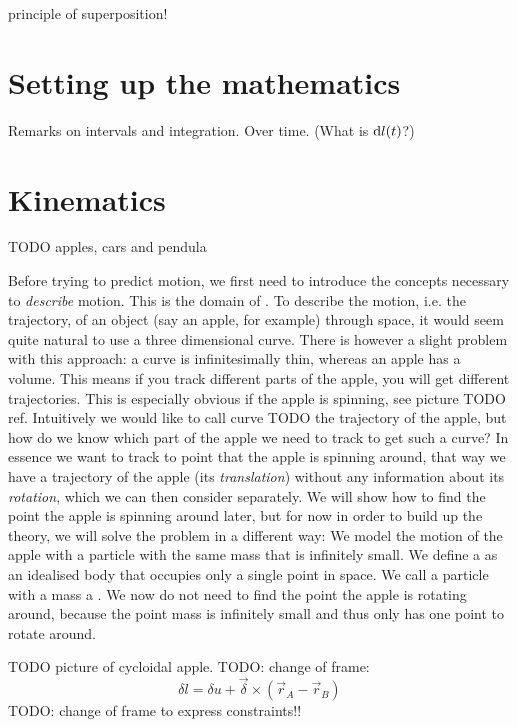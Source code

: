 principle of superposition!

\chapter{Setting up the mathematics}
Remarks on intervals and integration. Over time. (What is $\operatorname{d \!}{l(t)}$?)

\chapter{Kinematics}
TODO apples, cars and pendula


Before trying to predict motion, we first need to introduce the concepts necessary to \textit{describe} motion. This is the domain of . To describe the motion, i.e. the trajectory, of an object (say an apple, for example) through space, it would seem quite natural to use a three dimensional curve. There is however a slight problem with this approach: a curve is infinitesimally thin, whereas an apple has a volume. This means if you track different parts of the apple, you will get different trajectories. This is especially obvious if the apple is spinning, see picture TODO ref. Intuitively we would like to call curve TODO the trajectory of the apple, but how do we know which part of the apple we need to track to get such a curve? In essence we want to track to point that the apple is spinning around, that way we have a trajectory of the apple (its \textit{translation}) without any information about its \textit{rotation}, which we can then consider separately. We will show how to find the point the apple is spinning around later, but for now in order to build up the theory, we will solve the problem in a different way: We model the motion of the apple with a particle with the same mass that is infinitely small. We define a  as an idealised body that occupies only a single point in space. We call a particle with a mass a . We now do not need to find the point the apple is rotating around, because the point mass is infinitely small and thus only has one point to rotate around.

TODO picture of cycloidal apple.
TODO: change of frame:
\[ \delta l = \delta u + \vec{\delta} \times (\vec{r}_A - \vec{r}_B) \]
TODO: change of frame to express constraints!!


